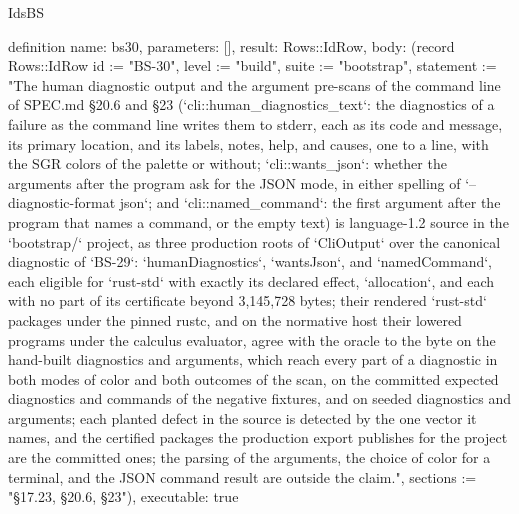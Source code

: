 \begin{lexlean}{IdsBS}
\begin{semanticmodule}
definition{
  name: bs30,
  parameters: [],
  result: Rows::IdRow,
  body: (record Rows::IdRow {id := "BS-30", level := "build", suite := "bootstrap", statement := "The human diagnostic output and the argument pre-scans of the command line of SPEC.md §20.6 and §23 (`cli::human_diagnostics_text`: the diagnostics of a failure as the command line writes them to stderr, each as its code and message, its primary location, and its labels, notes, help, and causes, one to a line, with the SGR colors of the palette or without; `cli::wants_json`: whether the arguments after the program ask for the JSON mode, in either spelling of `--diagnostic-format json`; and `cli::named_command`: the first argument after the program that names a command, or the empty text) is language-1.2 source in the `bootstrap/` project, as three production roots of `CliOutput` over the canonical diagnostic of `BS-29`: `humanDiagnostics`, `wantsJson`, and `namedCommand`, each eligible for `rust-std` with exactly its declared effect, `allocation`, and each with no part of its certificate beyond 3,145,728 bytes; their rendered `rust-std` packages under the pinned rustc, and on the normative host their lowered programs under the calculus evaluator, agree with the oracle to the byte on the hand-built diagnostics and arguments, which reach every part of a diagnostic in both modes of color and both outcomes of the scan, on the committed expected diagnostics and commands of the negative fixtures, and on seeded diagnostics and arguments; each planted defect in the source is detected by the one vector it names, and the certified packages the production export publishes for the project are the committed ones; the parsing of the arguments, the choice of color for a terminal, and the JSON command result are outside the claim.", sections := "§17.23, §20.6, §23"}),
  executable: true
}


\end{semanticmodule}
\end{lexlean}
